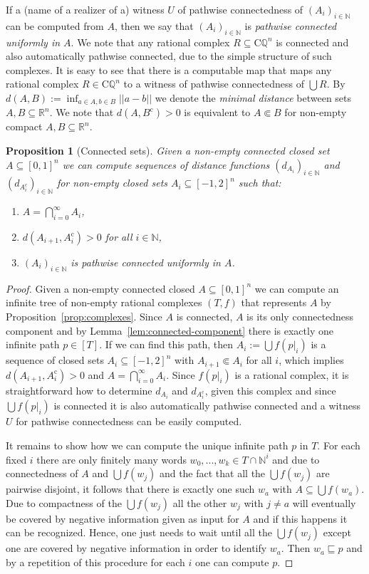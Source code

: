 \documentclass[a4paper]{amsart}
\def\IN{{\mathbb{N}}}
\def\IQ{{\mathbb{Q}}}
\def\IR{{\mathbb{R}}}
\def\In{\subseteq}
\def\prefix{\sqsubseteq}
\def\cc{\mathrm c}
\def\CQ{\mathrm C\IQ}
\newtheorem{proposition}[theorem]{Proposition}
\theoremstyle{definition}
\begin{document}
If a (name of a realizer of a) witness $U$ of pathwise connectedness of $(A_i)_{i\in\IN}$ can be computed from $A$, then 
we say that $(A_i)_{i\in\IN}$ is {\em pathwise connected uniformly in $A$}.
We note that any rational complex $R\In\CQ^n$ is connected and also automatically pathwise connected,
due to the simple structure of such complexes.
It is easy to see that there is a computable map that maps any rational complex $R\in\CQ^n$ to a witness of
pathwise connectedness of $\bigcup R$.
By $d(A,B):=\inf_{a\in A,b\in B}||a-b||$ we denote the {\em minimal distance} between sets $A,B\In\IR^n$.
We note that $d(A,B^\cc)>0$ is equivalent to $A\Subset B$ for non-empty compact $A,B\In\IR^n$.

\begin{proposition}[Connected sets]
\label{prop:connected-path-connected}
Given a non-empty connected closed set $A\In[0,1]^n$ 
we can compute sequences of distance functions $(d_{A_i})_{i\in\IN}$ and $(d_{A_i^\cc})_{i\in\IN}$
for non-empty closed sets $A_i\In[-1,2]^n$ such that:
\begin{enumerate}
\item $A=\bigcap_{i=0}^\infty A_i$,
\item $d(A_{i+1},A_i^\cc)>0$ for all $i\in\IN$,
\item $(A_i)_{i\in\IN}$ is pathwise connected uniformly in $A$.
\end{enumerate}
\end{proposition}
\begin{proof}
Given a non-empty connected closed $A\In[0,1]^n$ we can compute an infinite tree of non-empty rational complexes $(T,f)$ that
represents $A$ by Proposition~\ref{prop:complexes}.
Since $A$ is connected, $A$ is its only connectedness component and by Lemma~\ref{lem:connected-component} 
there is exactly one infinite path $p\in[T]$. 
If we can find this path, then $A_i:=\bigcup f(p|_i)$ is a sequence of closed sets $A_i\In[-1,2]^n$
with $A_{i+1}\Subset A_i$ for all $i$, which implies $d(A_{i+1},A_i^\cc)>0$ and $A=\bigcap_{i=0}^\infty A_i$. 
Since $f(p|_i)$ is a rational complex, it is straightforward how to determine $d_{A_i}$ and $d_{A_i^\cc}$, given
this complex and since $\bigcup f(p|_i)$ is connected it is also automatically pathwise connected and
a witness $U$ for pathwise connectedness can be easily computed. 

It remains to show how we can compute the unique infinite path $p$ in $T$.
For each fixed $i$ there are only finitely many words $w_0,...,w_k\in T\cap\IN^i$ and 
due to connectedness of $A$ and $\bigcup f(w_j)$ and the fact that all the $\bigcup f(w_j)$
are pairwise disjoint, it follows that there is exactly one such $w_a$ with $A\In\bigcup f(w_a)$. 
Due to compactness of the $\bigcup f(w_j)$ all the other $w_j$ with $j\not=a$ will eventually
be covered by negative information given as input for $A$ and if this happens it can be recognized. 
Hence, one just needs to wait until all the $\bigcup f(w_j)$ except one are covered by
negative information in order to identify $w_a$. Then $w_a\prefix p$ and by a repetition of this
procedure for each $i$ one can compute $p$.
\end{proof}
\end{document}

